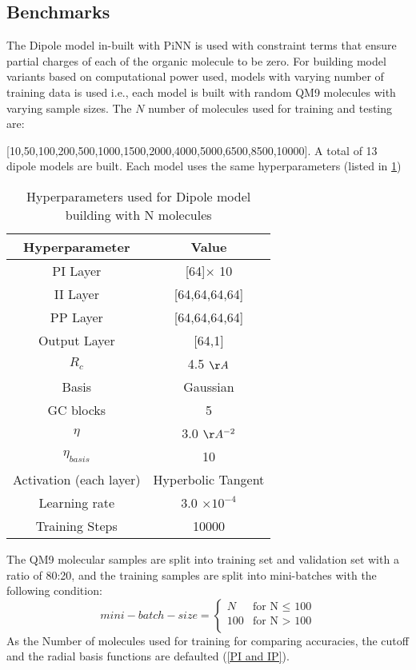 \documentclass[11pt,a4paper]{report}
\begin{document}
{\subsection{Benchmarks}
The Dipole model in-built with PiNN is used with constraint terms that ensure partial charges of each of the organic molecule to be zero. For building model variants based on computational power used, models with varying number of training data is used i.e., each model is built with random QM9 molecules with varying sample sizes. The $N$ number of molecules used for training and testing are: 

[10,50,100,200,500,1000,1500,2000,4000,5000,6500,8500,10000]. A total of 13 dipole models are built. Each model uses the same hyperparameters (listed in \ref{hyparam})
\begin{table} [H]
\centering
\begin{tabular}{c|c}
\hline
Hyperparameter & Value\\ [0.5ex]
\hline
PI Layer & [64]$\times$ 10 \\
II Layer & [64,64,64,64] \\
PP Layer & [64,64,64,64] \\
Output Layer & [64,1] \\
$R_c$ & 4.5 $\AA$ \\
Basis & Gaussian \\
GC blocks & 5 \\
$\eta$ & 3.0 $\AA^{-2}$ \\
$\eta_{basis}$ & 10 \\
Activation (each layer) & Hyperbolic Tangent \\
Learning rate & 3.0 $\times 10^{-4}$ \\
Training Steps & 10000 \\
\end{tabular}
\caption{Hyperparameters used for Dipole model building with N molecules}
\label{hyparam}
\end{table}
The QM9 molecular samples are split into training set and validation set with a ratio of 80:20, and the training samples are split into mini-batches with the following condition:
\begin{equation}
mini-batch-size =
\begin{cases}
 N & \text{for N $\leq$ 100} \\ 
100 & \text{for N $>$ 100} \\ 
\end{cases} 
\end{equation}
As the Number of molecules used for training for comparing accuracies, the cutoff and the radial basis functions are defaulted (\ref{PI and IP}).

}
\end{document}
